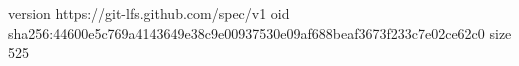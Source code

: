 version https://git-lfs.github.com/spec/v1
oid sha256:44600e5c769a4143649e38c9e00937530e09af688beaf3673f233c7e02ce62c0
size 525
